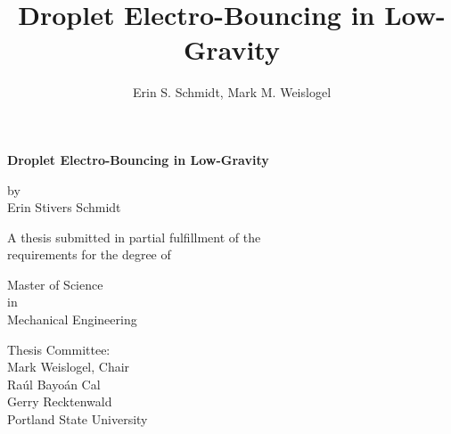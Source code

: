 \documentclass[12pt,a4paper,oneside]{book}
\title{\textsf{\textbf{Droplet Electro-Bouncing in Low-Gravity}}}
\author{Erin S. Schmidt, Mark M. Weislogel}
\date{}
\newcommand\blankpage{%
    \null
    \thispagestyle{empty}%
    \addtocounter{page}{-1}%
    \newpage}
\begin{document}
\begin{titlepage}
\doublespacing

\centering %
{\large \textsf{\textbf{Droplet Electro-Bouncing in Low-Gravity}}}

\vspace{15ex}
by\\
Erin Stivers Schmidt

\vspace{15ex}
\singlespacing
A thesis submitted in partial fulfillment of the\\
requirements for the degree of

\vspace{11ex}
Master of Science\\
in\\
Mechanical Engineering

\vspace{12ex}
Thesis Committee:\\
Mark Weislogel, Chair\\
Ra\'ul Bayo\'an Cal\\
Gerry Recktenwald\\


\vfill
\vspace{2ex}
Portland State University\\%
{\number\year}
\end{titlepage}


\doublespacing
\clearpage

\frontmatter

\doublespacing
\end{document}
